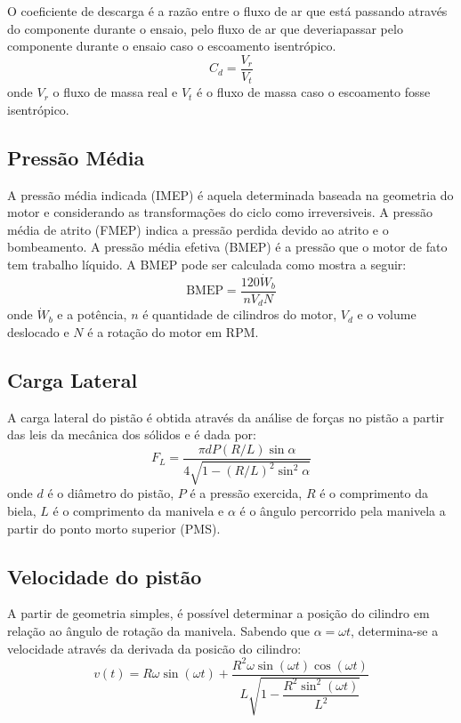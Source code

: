 O coeficiente de descarga é a razão entre o fluxo de ar que está passando através do componente durante o ensaio, pelo fluxo de ar que deveriapassar pelo componente durante o ensaio caso o escoamento isentrópico.
%
\begin{equation}
    C_d = \frac{V_r}{V_t}
    \label{eq:coef_descarga}
\end{equation}
%
onde $V_r$ o fluxo de massa real e $V_t$ é o fluxo de massa caso o escoamento fosse isentrópico.

\subsection{Pressão Média}

A pressão média indicada (IMEP) é aquela determinada baseada na geometria do motor e considerando as transformações do ciclo como irreversiveis. 
A pressão média de atrito (FMEP) indica a pressão perdida devido ao atrito e o bombeamento.
A pressão média efetiva (BMEP) é a pressão que o motor de fato tem trabalho líquido.
A BMEP pode ser calculada como mostra a seguir:
%
\begin{equation}
    \text{BMEP} = \frac{120 \dot{W}_b}{n V_d N}
    \label{eq:bmep}
\end{equation}
%
onde $\dot{W}_b$ e a potência, $n$ é quantidade de cilindros do motor, $V_d$ e o volume deslocado e $N$ é a rotação do motor em RPM.

\subsection{Carga Lateral}

A carga lateral do pistão é obtida através da análise de forças no pistão a partir das leis da mecânica dos sólidos e é dada por:
%
\begin{equation}
    F_L = \frac{\pi d P (R/L) \sin\alpha}{4\sqrt{1-(R/L)^2\sin^2\alpha}}
    \label{eq:carga_lateral}
\end{equation}
%
onde $d$ é o diâmetro do pistão, $P$ é a pressão exercida, $R$ é o comprimento da biela, $L$ é o comprimento da manivela e $\alpha$ é o ângulo percorrido pela manivela a partir do ponto morto superior (PMS).

\subsection{Velocidade do pistão}

A partir de geometria simples, é possível determinar a posição do cilindro em relação ao ângulo de rotação da manivela. Sabendo que $\alpha=\omega t$, determina-se a velocidade através da derivada da posicão do cilindro:
%
\begin{equation}
    v(t) = R \omega \sin{\left(\omega t \right)} + \frac{R^{2} \omega \sin{\left(\omega t \right)} \cos{\left(\omega t \right)}}{L \sqrt{1 - \dfrac{R^{2} \sin^{2}{\left(\omega t \right)}}{L^{2}}}}
    \label{eq:velocidade}
\end{equation}

